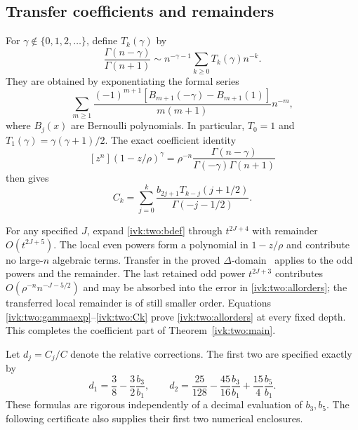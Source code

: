 \documentclass[11pt,letterpaper]{article}
\theoremstyle{remark}\newtheorem{remark}[theorem]{Remark}
\begin{document}
\subsection{Transfer coefficients and remainders}
For $\gamma\notin\{0,1,2,\ldots\}$, define $T_k(\gamma)$ by
\begin{equation}\label{ivk:two:gammaexp}
 \frac{\Gamma(n-\gamma)}{\Gamma(n+1)}
 \sim n^{-\gamma-1}\sum_{k\ge0}T_k(\gamma)n^{-k}.
\end{equation}
They are obtained by exponentiating the formal series
\begin{equation}\label{ivk:two:bernoulli}
 \sum_{m\ge1}\frac{(-1)^{m+1}
 [B_{m+1}(-\gamma)-B_{m+1}(1)]}{m(m+1)}n^{-m},
\end{equation}
where $B_j(x)$ are Bernoulli polynomials. In particular,
$T_0=1$ and $T_1(\gamma)=\gamma(\gamma+1)/2$.
The exact coefficient identity
\[
 [z^n](1-z/\rho)^\gamma
 =\rho^{-n}\frac{\Gamma(n-\gamma)}{\Gamma(-\gamma)\Gamma(n+1)}
\]
then gives
\begin{equation}\label{ivk:two:Ck}
 C_k=\sum_{j=0}^k
 \frac{b_{2j+1}T_{k-j}(j+1/2)}{\Gamma(-j-1/2)}.
\end{equation}

For any specified $J$, expand \eqref{ivk:two:bdef} through $t^{2J+4}$ with
remainder $O(t^{2J+5})$. The local even powers form a polynomial in
$1-z/\rho$ and contribute no large-$n$ algebraic terms. Transfer in
the proved $\Delta$-domain~\cite[Chapter VI]{fs} applies to the odd
powers and the remainder. The last retained odd power $t^{2J+3}$
contributes $O(\rho^{-n}n^{-J-5/2})$ and may be absorbed into the
error in \eqref{ivk:two:allorders}; the transferred local remainder is of
still smaller order. Equations \eqref{ivk:two:gammaexp}--\eqref{ivk:two:Ck} prove
\eqref{ivk:two:allorders} at every fixed depth. This completes the coefficient
part of Theorem~\ref{ivk:two:main}.

Let $d_j=C_j/C$ denote the relative corrections. The first two are
specified exactly by
\begin{equation}\label{ivk:two:d12}
 d_1=\frac38-\frac32\frac{b_3}{b_1},\qquad
 d_2=\frac{25}{128}-\frac{45}{16}\frac{b_3}{b_1}
                  +\frac{15}{4}\frac{b_5}{b_1}.
\end{equation}
These formulas are rigorous independently of a decimal evaluation of
$b_3,b_5$. The following certificate also supplies their first two
numerical enclosures.
\end{document}
